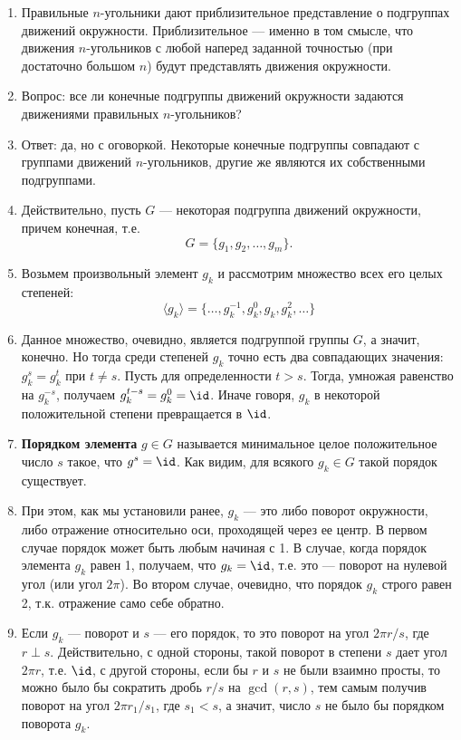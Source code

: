 \begin{enumerate}
\item Правильные $n$-угольники дают приблизительное представление о подгруппах движений окружности. Приблизительное --- именно в том смысле, что движения $n$-угольников с любой наперед заданной точностью (при достаточно большом $n$) будут представлять движения окружности.
\item Вопрос: все ли конечные подгруппы движений окружности задаются движениями правильных $n$-угольников?
\item Ответ: да, но с оговоркой. Некоторые конечные подгруппы совпадают с группами движений $n$-угольников, другие же являются их собственными подгруппами.
\item Действительно, пусть $G$ --- некоторая подгруппа движений окружности, причем конечная, т.е.
$$
G=\{g_1,g_2,\dots,g_m\}.
$$
\item Возьмем произвольный элемент $g_k$ и рассмотрим множество всех его целых степеней:
$$
\langle g_k\rangle=\{\dots,g_k^{-1},g_k^0,g_k,g_k^2,\dots\}
$$
\item Данное множество, очевидно, является подгруппой группы $G$, а значит, конечно. Но тогда среди степеней $g_k$ точно есть два совпадающих значения: $g_k^s=g_k^t$ при $t\ne s$. Пусть для определенности $t>s$. Тогда, умножая равенство на $g_k^{-s}$, получаем $g_k^{t-s}=g_k^0=\id$. Иначе говоря, $g_k$ в некоторой положительной степени превращается в $\id$.
\item \textbf{Порядком элемента} $g\in G$ называется минимальное целое положительное число $s$ такое, что $g^s=\id$. Как видим, для всякого $g_k\in G$ такой порядок существует.
\item При этом, как мы установили ранее, $g_k$ --- это либо поворот окружности, либо отражение относительно оси, проходящей через ее центр. В первом случае порядок может быть любым начиная с 1. В случае, когда порядок элемента $g_k$ равен 1, получаем, что $g_k=\id$, т.е. это --- поворот на нулевой угол (или угол $2\pi$). Во втором случае, очевидно, что порядок $g_k$ строго равен 2, т.к. отражение само себе обратно.
\item Если $g_k$ --- поворот и $s$ --- его порядок, то это поворот на угол $2\pi r/s$, где $r\perp s$. Действительно, с одной стороны, такой поворот в степени $s$ дает угол $2\pi r$, т.е. $\id$, с другой стороны, если бы $r$ и $s$ не были взаимно просты, то можно было бы сократить дробь $r/s$ на $\gcd(r,s)$, тем самым получив поворот на угол $2\pi r_1/s_1$, где $s_1<s$, а значит, число $s$ не было бы порядком поворота $g_k$.

\end{enumerate}
